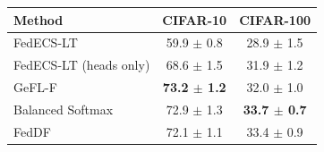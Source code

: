 \begin{tabular}{lcc}
\toprule
Method & CIFAR-10 & CIFAR-100\\
\midrule
FedECS-LT & 59.9 $\pm$ 0.8 & 28.9 $\pm$ 1.5\\
FedECS-LT (heads only) & 68.6 $\pm$ 1.5 & 31.9 $\pm$ 1.2\\
GeFL-F & \textbf{73.2 $\pm$ 1.2} & 32.0 $\pm$ 1.0\\
Balanced Softmax & 72.9 $\pm$ 1.3 & \textbf{33.7 $\pm$ 0.7}\\
FedDF & 72.1 $\pm$ 1.1 & 33.4 $\pm$ 0.9\\
\bottomrule
\end{tabular}
